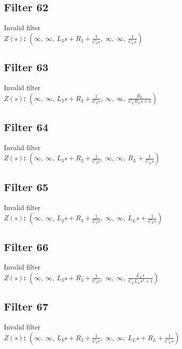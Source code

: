 \documentclass{article}
\begin{document}
\subsection*{Filter 62}
Invalid filter \\ 
\textbf{$Z(s)$:} $\left( \infty, \  \infty, \  L_{3} s + R_{3} + \frac{1}{C_{3} s}, \  \infty, \  \infty, \  \frac{1}{C_{L} s}\right)$ \\ 
\subsection*{Filter 63}
Invalid filter \\ 
\textbf{$Z(s)$:} $\left( \infty, \  \infty, \  L_{3} s + R_{3} + \frac{1}{C_{3} s}, \  \infty, \  \infty, \  \frac{R_{L}}{C_{L} R_{L} s + 1}\right)$ \\ 
\subsection*{Filter 64}
Invalid filter \\ 
\textbf{$Z(s)$:} $\left( \infty, \  \infty, \  L_{3} s + R_{3} + \frac{1}{C_{3} s}, \  \infty, \  \infty, \  R_{L} + \frac{1}{C_{L} s}\right)$ \\ 
\subsection*{Filter 65}
Invalid filter \\ 
\textbf{$Z(s)$:} $\left( \infty, \  \infty, \  L_{3} s + R_{3} + \frac{1}{C_{3} s}, \  \infty, \  \infty, \  L_{L} s + \frac{1}{C_{L} s}\right)$ \\ 
\subsection*{Filter 66}
Invalid filter \\ 
\textbf{$Z(s)$:} $\left( \infty, \  \infty, \  L_{3} s + R_{3} + \frac{1}{C_{3} s}, \  \infty, \  \infty, \  \frac{L_{L} s}{C_{L} L_{L} s^{2} + 1}\right)$ \\ 
\subsection*{Filter 67}
Invalid filter \\ 
\textbf{$Z(s)$:} $\left( \infty, \  \infty, \  L_{3} s + R_{3} + \frac{1}{C_{3} s}, \  \infty, \  \infty, \  L_{L} s + R_{L} + \frac{1}{C_{L} s}\right)$ \\ 
\end{document}

